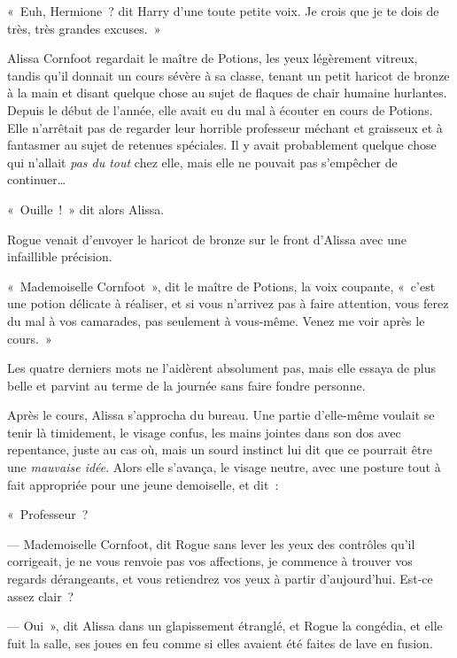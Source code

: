 
«~Euh, Hermione~? dit Harry d'une toute petite voix. Je crois que je te dois de très, très grandes excuses.~»


Alissa Cornfoot regardait le maître de Potions, les yeux légèrement vitreux, tandis qu'il donnait un cours sévère à sa classe, tenant un petit haricot de bronze à la main et disant quelque chose au sujet de flaques de chair humaine hurlantes. Depuis le début de l'année, elle avait eu du mal à écouter en cours de Potions. Elle n'arrêtait pas de regarder leur horrible professeur méchant et graisseux et à fantasmer au sujet de retenues spéciales. Il y avait probablement quelque chose qui n'allait \emph{pas du tout} chez elle, mais elle ne pouvait pas s'empêcher de continuer…

«~Ouille~!~» dit alors Alissa.

Rogue venait d'envoyer le haricot de bronze sur le front d'Alissa avec une infaillible précision.

«~Mademoiselle Cornfoot~», dit le maître de Potions, la voix coupante, «~c'est une potion délicate à réaliser, et si vous n'arrivez pas à faire attention, vous ferez du mal à vos camarades, pas seulement à vous-même. Venez me voir après le cours.~»

Les quatre derniers mots ne l'aidèrent absolument pas, mais elle essaya de plus belle et parvint au terme de la journée sans faire fondre personne.

Après le cours, Alissa s'approcha du bureau. Une partie d'elle-même voulait se tenir là timidement, le visage confus, les mains jointes dans son dos avec repentance, juste au cas où, mais un sourd instinct lui dit que ce pourrait être une \emph{mauvaise idée}. Alors elle s'avança, le visage neutre, avec une posture tout à fait appropriée pour une jeune demoiselle, et dit~:

«~Professeur~?

--- Mademoiselle Cornfoot, dit Rogue sans lever les yeux des contrôles qu'il corrigeait, je ne vous renvoie pas vos affections, je commence à trouver vos regards dérangeants, et vous retiendrez vos yeux à partir d'aujourd'hui. Est-ce assez clair~?

--- Oui~», dit Alissa dans un glapissement étranglé, et Rogue la congédia, et elle fuit la salle, ses joues en feu comme si elles avaient été faites de lave en fusion.

